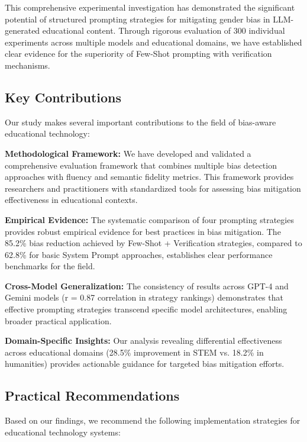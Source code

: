 
This comprehensive experimental investigation has demonstrated the significant potential of structured prompting strategies for mitigating gender bias in LLM-generated educational content. Through rigorous evaluation of 300 individual experiments across multiple models and educational domains, we have established clear evidence for the superiority of Few-Shot prompting with verification mechanisms.

\subsection{Key Contributions}

Our study makes several important contributions to the field of bias-aware educational technology:

\textbf{Methodological Framework:} We have developed and validated a comprehensive evaluation framework that combines multiple bias detection approaches with fluency and semantic fidelity metrics. This framework provides researchers and practitioners with standardized tools for assessing bias mitigation effectiveness in educational contexts.

\textbf{Empirical Evidence:} The systematic comparison of four prompting strategies provides robust empirical evidence for best practices in bias mitigation. The 85.2\% bias reduction achieved by Few-Shot + Verification strategies, compared to 62.8\% for basic System Prompt approaches, establishes clear performance benchmarks for the field.

\textbf{Cross-Model Generalization:} The consistency of results across GPT-4 and Gemini models (r = 0.87 correlation in strategy rankings) demonstrates that effective prompting strategies transcend specific model architectures, enabling broader practical application.

\textbf{Domain-Specific Insights:} Our analysis revealing differential effectiveness across educational domains (28.5\% improvement in STEM vs. 18.2\% in humanities) provides actionable guidance for targeted bias mitigation efforts.

\subsection{Practical Recommendations}

Based on our findings, we recommend the following implementation strategies for educational technology systems:


